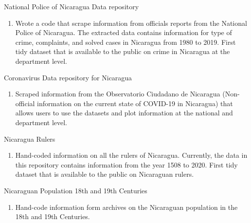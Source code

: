 \documentclass[a4paper, 10pt]{article}
\renewenvironment{itemize}{
  \begin{list}{}
    { \setlength{\itemsep}{5pt}
      \setlength{\parsep}{0pt}
      \setlength{\topsep}{0pt}
      \setlength{\leftmargin}{0em} } }{
  \end{list}}
\begin{document}
\begin{itemize}
\begin{enumerate}[label = {-}]
   \end{enumerate}
   National Police of Nicaragua Data repository \href{https://github.com/RRMaximiliano/policia-nacional-nic-stats}{\faGithub}
   \begin{enumerate}[label = {-}]
    \item Wrote a code that scrape information from officials reports from the National Police of Nicaragua. The extracted data contains information for type of crime, complaints, and solved cases in Nicaragua from 1980 to 2019. First tidy dataset that is available to the public on crime in Nicaragua at the department level. 
   \end{enumerate}
   Coronavirus Data repository for Nicaragua \href{https://github.com/RRMaximiliano/observatorio-covid-nicaragua}{\faGithub}
   \begin{enumerate}[label = {-}]
    \item Scraped information from the Observatorio Ciudadano de Nicaragua (Non-official information on the current state of COVID-19 in Nicaragua) that allows users to use the datasets and plot information at the national and department level. 
   \end{enumerate}
   Nicaragua Rulers \href{https://github.com/RRMaximiliano/observatorio-covid-nicaragua}{\faGithub}
   \begin{enumerate}[label = {-}]
    \item Hand-coded information on all the rulers of Nicaragua. Currently, the data in this repository contains information from the year 1508 to 2020. First tidy dataset that is available to the public on Nicaraguan rulers.
   \end{enumerate}
   Nicaraguan Population 18th and 19th Centuries \href{https://github.com/RRMaximiliano/poblacion-nicaragua-siglo-18-19}{\faGithub}
   \begin{enumerate}[label = {-}]
    \item Hand-code information form archives on the Nicaraguan population in the 18th and 19th Centuries.
   \end{enumerate}
\end{itemize}
\end{document}
